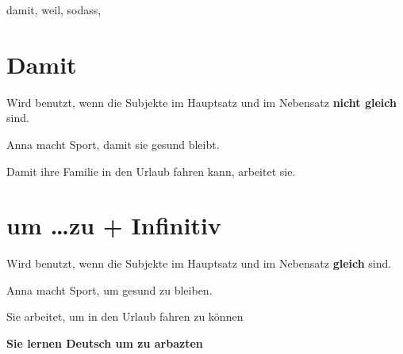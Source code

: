 damit, weil, sodass,

\section{Damit}

Wird benutzt, wenn die Subjekte im Hauptsatz und im Nebensatz \textbf{nicht gleich} sind.

Anna macht Sport, damit sie gesund bleibt.

Damit ihre Familie in den Urlaub fahren kann, arbeitet sie.


\section{um \dots zu + Infinitiv}

Wird benutzt, wenn die Subjekte im Hauptsatz und im Nebensatz \textbf{gleich} sind.

Anna macht Sport, um gesund zu bleiben.

Sie arbeitet, um in den Urlaub fahren zu können

\textbf{Sie lernen Deutsch um zu arbazten}